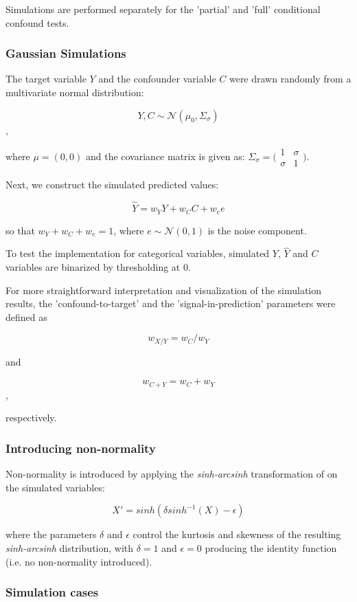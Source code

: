 \documentclass{article}
\begin{document}
Simulations are performed separately for the 'partial' and 'full' conditional confound tests.

\subsubsection*{Gaussian Simulations}
The target variable $Y$ and the confounder variable $C$ were drawn randomly from a multivariate normal distribution:

$$ Y, C \sim \mathcal{N}(\mu_0, \Sigma_\sigma) $$,

where $\mu=(0, 0)$ and the covariance matrix is given as:
$\Sigma_\sigma = \big(\begin{smallmatrix}
  1 & \sigma\\
  \sigma & 1
\end{smallmatrix}\big)$.

Next, we construct the simulated predicted values:

$$ \hat{Y} = w_Y Y + w_C C + w_e e$$

so that $w_Y + w_C + w_e = 1$, where $e \sim \mathcal{N}(0,1)$ is the noise component.

To test the implementation for categorical variables, simulated $Y$, $\hat{Y}$ and $C$ variables are binarized by thresholding at 0.

For more straightforward interpretation and visualization of the simulation results, the 'confound-to-target' and the 'signal-in-prediction' parameters were defined as

$$ w_{X/Y} = w_C / w_Y $$

and

$$ w_{C+Y} = w_C + w_Y $$,

respectively.

\subsubsection*{Introducing non-normality}

Non-normality is introduced by applying the \emph{sinh-arcsinh} transformation of \cite{jones2009sinh} on the simulated variables:

$$X' = sinh(\delta sinh^{-1}(X) - \epsilon)$$

where the parameters $\delta$ and $\epsilon$ control the kurtosis and skewness of the resulting \emph{sinh-arcsinh} distribution, with $\delta=1$ and $\epsilon=0$ producing the identity function (i.e. no non-normality introduced).

\subsubsection*{Simulation cases}
\end{document}
